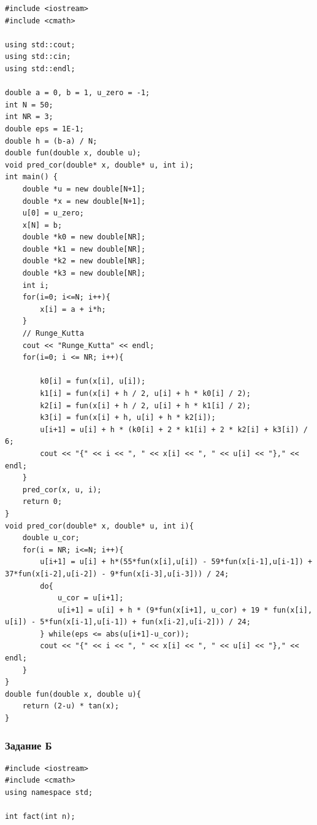 \documentclass[
11pt,
master, %
subf, %
href, %
colorlinks=true, %
times, %
]{disser}
\begin{document}
{\tiny
\begin{verbatim}
#include <iostream>
#include <cmath>

using std::cout;
using std::cin;
using std::endl;

double a = 0, b = 1, u_zero = -1;
int N = 50;
int NR = 3;
double eps = 1E-1;
double h = (b-a) / N;
double fun(double x, double u);
void pred_cor(double* x, double* u, int i);
int main() {
    double *u = new double[N+1];
    double *x = new double[N+1];
    u[0] = u_zero;
    x[N] = b;
    double *k0 = new double[NR];
    double *k1 = new double[NR];
    double *k2 = new double[NR];
    double *k3 = new double[NR];
    int i;
    for(i=0; i<=N; i++){
        x[i] = a + i*h;
    }
    // Runge_Kutta
    cout << "Runge_Kutta" << endl;
    for(i=0; i <= NR; i++){

        k0[i] = fun(x[i], u[i]);
        k1[i] = fun(x[i] + h / 2, u[i] + h * k0[i] / 2);
        k2[i] = fun(x[i] + h / 2, u[i] + h * k1[i] / 2);
        k3[i] = fun(x[i] + h, u[i] + h * k2[i]);
        u[i+1] = u[i] + h * (k0[i] + 2 * k1[i] + 2 * k2[i] + k3[i]) / 6;
        cout << "{" << i << ", " << x[i] << ", " << u[i] << "}," << endl;
    }
    pred_cor(x, u, i);
    return 0;
}
void pred_cor(double* x, double* u, int i){
    double u_cor;
    for(i = NR; i<=N; i++){
        u[i+1] = u[i] + h*(55*fun(x[i],u[i]) - 59*fun(x[i-1],u[i-1]) + 37*fun(x[i-2],u[i-2]) - 9*fun(x[i-3],u[i-3])) / 24;
        do{
            u_cor = u[i+1];
            u[i+1] = u[i] + h * (9*fun(x[i+1], u_cor) + 19 * fun(x[i], u[i]) - 5*fun(x[i-1],u[i-1]) + fun(x[i-2],u[i-2])) / 24;
        } while(eps <= abs(u[i+1]-u_cor));
        cout << "{" << i << ", " << x[i] << ", " << u[i] << "}," << endl;
    }
}
double fun(double x, double u){
    return (2-u) * tan(x);
}
\end{verbatim}

\subsubsection{Задание Б}
\begin{verbatim}
#include <iostream>
#include <cmath>
using namespace std;

int fact(int n);


\end{verbatim}}
\end{document}
